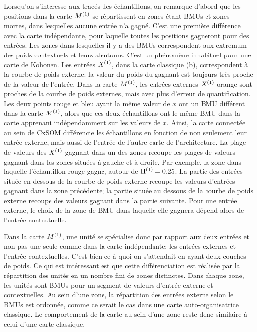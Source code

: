 \documentclass[../main]{subfiles}
\begin{document}
Lorsqu'on s'intéresse aux tracés des échantillons, on remarque d'abord que les positions dans la carte $M^{({1})}$ se répartissent en zones étant BMUs et zones mortes, dans lesquelles aucune entrée n'a gagné. C'est une première différence avec la carte indépendante, pour laquelle toutes les positions gagneront pour des entrées. Les zones dans lesquelles il y a des BMUs correspondent aux extremum des poids contextuels et leurs alentours. C'est un phénomène inhabituel pour une carte de Kohonen. Les entrées $X^{({1})}$, dans la carte classique (b), correspondent à la courbe de poids externe: la valeur du poids du gagnant est toujours très proche de la valeur de l'entrée. Dans la carte $M^{({1})}$, les entrées externes $X^{({1})}$ orange sont proches de la courbe de poids externes, mais avec plus d'erreur de quantification.
Les deux points rouge et bleu ayant la même valeur de $x$ ont un BMU différent dans la carte $M^{({1})}$, alors que ces deux échantillons ont le même BMU dans la carte apprenant indépendamment sur les valeurs de $x$. Ainsi, la carte connectée au sein de CxSOM différencie les échantillons en fonction de non seulement leur entrée externe, mais aussi de l'entrée de l'autre carte de l'architecture. La plage de valeurs des $X^{({1})}$ gagnant dans un des zones recoupe les plages de valeurs gagnant dans les zones situées à gauche et à droite. Par exemple, la zone dans laquelle l'échantillon rouge gagne, autour de $\Pi^{({1})} = 0.25$. La partie des entrées située en dessous de la courbe de poids externe recoupe les valeurs d'entrées gagnant dans la zone précédente; la partie située au dessous de la courbe de poids externe recoupe des valeurs gagnant dans la partie suivante. Pour une entrée externe, le choix de la zone de BMU dans laquelle elle gagnera dépend alors de l'entrée contextuelle. 


Dans la carte $M^{({1})}$, une unité se spécialise donc par rapport aux deux entrées et non pas une seule comme dans la carte indépendante: les entrées externes et l'entrée contextuelles. C'est bien ce à quoi on s'attendait en ayant deux couches de poids. Ce qui est intéressant est que cette différenciation est réalisée par la répartition des unités en un nombre fini de zones distinctes. Dans chaque zone, les unités sont BMUs pour un segment de valeurs d'entrée externe et contextuelles. Au sein d'une zone, la répartition des entrées externe selon le BMUs est ordonnée, comme ce serait le cas dans une carte auto-organisatrice classique. Le comportement de la carte au sein d'une zone reste donc similaire à celui d'une carte classique.
\end{document}
